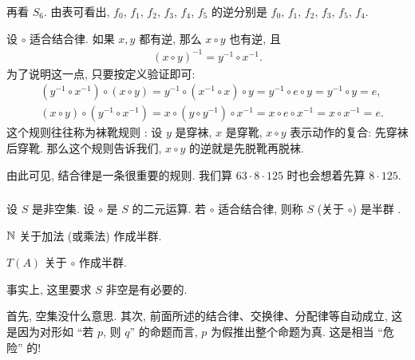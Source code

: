 \begin{example}
    再看 $S_6$. 由表可看出, $f_0$, $f_1$, $f_2$, $f_3$, $f_4$, $f_5$ 的逆分别是 $f_0$, $f_1$, $f_2$, $f_3$, $f_5$, $f_4$.
\end{example}

\begin{remark}
    设 $\circ$ 适合结合律. 如果 $x,y$ 都有逆, 那么 $x \circ y$ 也有逆, 且
    \begin{align*}
        (x \circ y)^{-1} = y^{-1} \circ x^{-1}.
    \end{align*}
    为了说明这一点, 只要按定义验证即可:
    \begin{align*}
         & (y^{-1} \circ x^{-1}) \circ (x \circ y) = y^{-1} \circ (x^{-1} \circ x) \circ y = y^{-1} \circ e \circ y = y^{-1} \circ y = e, \\
         & (x \circ y) \circ (y^{-1} \circ x^{-1}) = x \circ (y \circ y^{-1}) \circ x^{-1} = x \circ e \circ x^{-1} = x \circ x^{-1} = e.
    \end{align*}
    这个规则往往称为袜靴规则 : 设 $y$ 是穿袜, $x$ 是穿靴, $x \circ y$ 表示动作的复合: 先穿袜后穿靴. 那么这个规则告诉我们, $x \circ y$ 的逆就是先脱靴再脱袜.
\end{remark}

\begin{remark}
    由此可见, 结合律是一条很重要的规则. 我们算 $63 \cdot 8 \cdot 125$ 时也会想着先算 $8 \cdot 125$.
\end{remark}

\subsubsection*{\SemiGroupsAndGroups}

\begin{definition}
    设 $S$ 是非空集. 设 $\circ$ 是 $S$ 的二元运算. 若 $\circ$ 适合结合律, 则称 $S$ (关于 $\circ$) 是半群 .
\end{definition}

\begin{example}
    $\mathbb{N}$ 关于加法 (或乘法) 作成半群.
\end{example}

\begin{example}
    $T(A)$ 关于 $\circ$ 作成半群.
\end{example}

\begin{remark}
    事实上, 这里要求 $S$ 非空是有必要的.

    首先, 空集没什么意思. 其次, 前面所述的结合律、交换律、分配律等自动成立, 这是因为对形如 ``若 $p$, 则 $q$'' 的命题而言, $p$ 为假推出整个命题为真. 这是相当 ``危险'' 的!
\end{remark}

